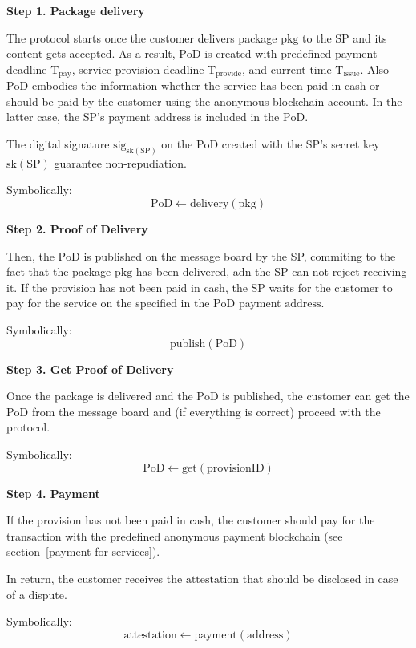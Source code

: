 \documentclass{ieeeaccess}
\begin{document}
\noindent \textbf
{Step 1. Package delivery}\label{step-1-package-delivery}

The protocol starts once the customer delivers package $\mathrm{pkg}$ to the SP and its content gets accepted. As a result, $\mathrm{PoD}$ is created with predefined payment deadline $\mathrm{T}_\mathrm{pay}$, service provision deadline $\mathrm{T}_\mathrm{provide}$, and current time $\mathrm{T}_\mathrm{issue}$. Also $\mathrm{PoD}$ embodies the information whether the service has been paid in cash or should be paid by the customer using the anonymous blockchain account. In the latter case, the SP's payment $\mathrm{address}$ is included in the $\mathrm{PoD}$.

The digital signature $\mathrm{sig}_{\mathrm{sk}(\mathrm{SP})}$ on the $\mathrm{PoD}$ created with the SP's secret key $\mathrm{sk}(\mathrm{SP})$ guarantee non-repudiation.

Symbolically: 
\[
\mathrm{PoD \gets delivery(pkg)}
\]

\noindent \textbf
{Step 2. Proof of Delivery}\label{step-2-pod}

Then, the $\mathrm{PoD}$ is published on the message board by the SP, commiting to the fact that the package $\mathrm{pkg}$ has been delivered, adn the SP can not reject receiving it. If the provision has not been paid in cash, the SP waits for the customer to pay for the service on the specified in the $\mathrm{PoD}$ payment $\mathrm{address}$.

Symbolically: 
\[
\mathrm{publish(PoD)}
\]

\noindent \textbf
{Step 3. Get Proof of Delivery}\label{step-3-get-pod}

Once the package is delivered and the $\mathrm{PoD}$ is published, the customer can get the $\mathrm{PoD}$ from the message board and (if everything is correct) proceed with the protocol.

Symbolically: 
\[
\mathrm{PoD \gets get(provisionID)}
\]

\noindent \textbf
{Step 4. Payment}\label{step-4-payment}

If the provision has not been paid in cash, the customer should pay for the transaction with the predefined anonymous payment blockchain (see section~\ref{payment-for-services}).

In return, the customer receives the $\mathrm{attestation}$ that should be disclosed in case of a dispute.

Symbolically: 
\[
\mathrm{attestation \gets payment(address)}
\]
\end{document}
